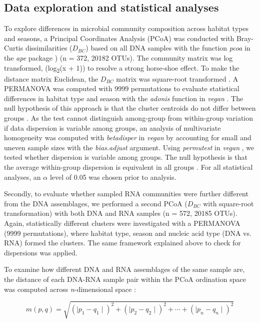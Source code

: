 \documentclass[12pt,a4paper]{article} %
\begin{document}
\subsection*{Data exploration and statistical analyses}
To explore differences in microbial community composition across habitat types and seasons, a Principal Coordinates Analysis (PCoA) was conducted with Bray-Curtis dissimilarities ($D_{BC}$) \citep{Bray1957, Legendre1998} based on all DNA samples with the function \textit{pcoa} in the \textit{ape} package \citep{Paradis2018}) (n = 372, 20182 OTUs). The community matrix was log transformed, (log\textsubscript{2}(x + 1)) to resolve a strong horse-shoe effect. To make the distance matrix Euclidean, the $D_{BC}$ matrix was square-root transformed \citep{Legendre1998, Borcard2011}. A PERMANOVA was computed with 9999 permutations to evaluate statistical differences in habitat type and season  with the \textit{adonis} function in \textit{vegan} \citep{Oksanen2017}. The null hypothesis of this approach is that the cluster centroids do not differ between groups \citep{Anderson2013}. As the test cannot distinguish among-group from within-group variation if data dispersion is variable among groups, an analysis of multivariate homogeneity was computed with \textit{betadisper} in \textit{vegan} \citep{Oksanen2017} by accounting for small and uneven sample sizes with the \textit{bias.adjust} argument. Using \textit{permutest} in \textit{vegan} \citep{Oksanen2017}, we tested whether dispersion is variable among groups. The null hypothesis is that the average within-group dispersion is equivalent in all groups \citep{Anderson2013}. For all statistical analyses, an $\alpha$ level of 0.05 was chosen prior to analysis.

Secondly, to evaluate whether sampled RNA communities were further different from the DNA assemblages, we performed a second PCoA ($D_{BC}$ with square-root transformation) with both DNA and RNA samples (n = 572, 20185 OTUs). Again, statistically different clusters were investigated with a PERMANOVA (9999 permutations), where habitat type, season and nucleic acid type (DNA vs. RNA) formed the clusters. The same framework explained above to check for dispersions was applied.

To examine how different DNA and RNA assemblages of the same sample are, the distance of each DNA-RNA sample pair within the PCoA ordination space was computed across \textit{n}-dimensional space \citep{Tabak2004}:


\[ m(p,q) = \sqrt{(\mid p_{1} - q_{1} \mid)^2 + (\mid p_{2} - q_{2} \mid)^2 + \cdots + (\mid p_{n} - q_{n} \mid)^2}\]
\end{document}
